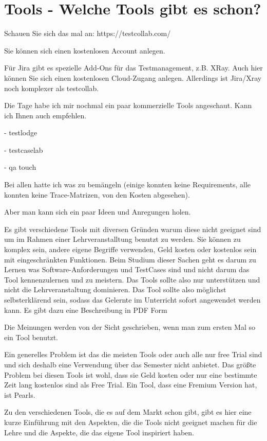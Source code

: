 \documentclass[11pt,a4paper]{report}
\begin{document}
\chapter{Tools - Welche Tools gibt es schon?} 
\label{chap:Tools}
Schauen Sie sich das mal an: https://testcollab.com/

Sie können sich einen kostenlosen Account anlegen.

Für Jira gibt es spezielle Add-Ons für das Testmanagement, z.B. XRay. Auch hier können Sie sich einen
kostenlosen Cloud-Zugang anlegen. Allerdings ist Jira/Xray noch komplexer als testcollab.

Die Tage habe ich mir nochmal ein paar kommerzielle Tools angeschaut. Kann ich Ihnen auch empfehlen.

-          testlodge

-          testcaselab

-          qa touch

 

Bei allen hatte ich was zu bemängeln (einige konnten keine Requirements, alle konnten keine Trace-Matrizen, von den Kosten abgesehen).

Aber man kann sich ein paar Ideen und Anregungen holen.





Es gibt verschiedene Tools mit diversen Gründen warum diese nicht geeignet sind um im Rahmen einer Lehrveranstalltung benutzt zu werden. Sie können zu komplex sein, andere eigene Begriffe verwenden, Geld kosten oder kostenlos sein mit eingeschränkten Funktionen. 
Beim Studium dieser Sachen geht es darum zu Lernen was Software-Anforderungen und TestCases sind und nicht darum das Tool kennenzulernen und zu meistern. Das Tools sollte also nur unterstützen und nicht die Lehrveranstaltung dominieren. Das Tool sollte also möglichst selbsterklärend sein, sodass das Gelernte im Unterricht sofort angewendet werden kann. Es gibt dazu eine Beschreibung in PDF Form

Die Meinungen werden von der Sicht geschrieben, wenn man zum ersten Mal so ein Tool benutzt.

Ein generelles Problem ist das die meisten Tools oder auch alle nur free Trial sind und sich deshalb eine Verwendung über das Semester nicht anbietet.
Das größte Problem bei diesen Tools ist wohl, dass sie Geld kosten oder nur eine bestimmte Zeit lang kostenlos sind als Free Trial. Ein Tool, dass eine Fremium Version hat, ist Pearls.

Zu den verschiedenen Tools, die es auf dem Markt schon gibt, gibt es hier eine kurze Einführung mit den Aspekten, die die Tools nicht geeignet machen für die Lehre und die Aspekte, die das eigene Tool inspiriert haben.
\end{document}
